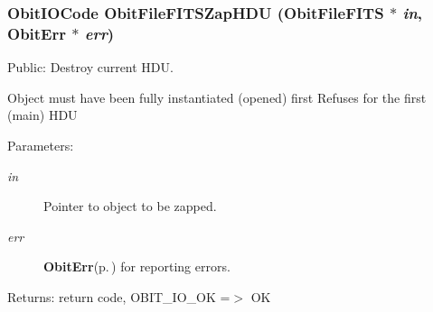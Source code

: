 \subsubsection{\setlength{\rightskip}{0pt plus 5cm}Obit\-IOCode Obit\-File\-FITSZap\-HDU ({\bf Obit\-File\-FITS} $\ast$ {\em in}, {\bf Obit\-Err} $\ast$ {\em err})}\label{ObitFileFITS_8h_a7}


Public: Destroy current HDU. 

Object must have been fully instantiated (opened) first Refuses for the first (main) HDU \begin{Desc}
\item[Parameters:]
\begin{description}
\item[{\em in}]Pointer to object to be zapped. \item[{\em err}]{\bf Obit\-Err}{\rm (p.\,\pageref{structObitErr})} for reporting errors. \end{description}
\end{Desc}
\begin{Desc}
\item[Returns:]return code, OBIT\_\-IO\_\-OK =$>$ OK \end{Desc}

